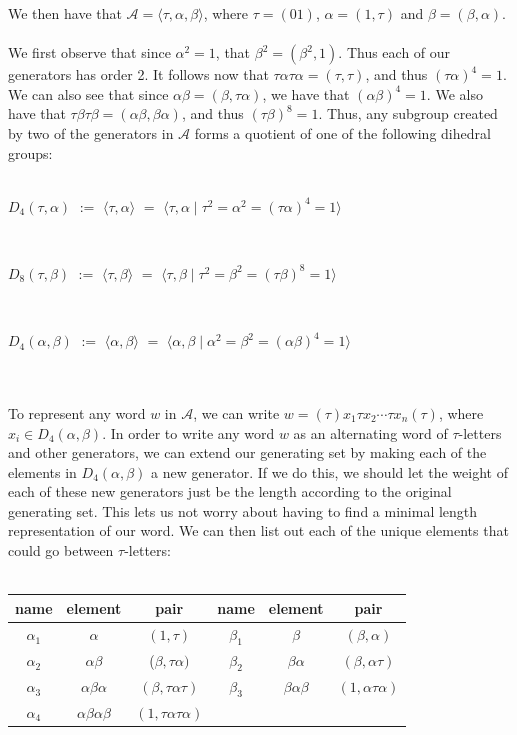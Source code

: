 \documentclass[11pt]{amsart}
\theoremstyle{definition}
\theoremstyle{remark}
\numberwithin{equation}{section}
\begin{document}
\noindent We then have that $\mathcal{A} = \langle \tau, \alpha, \beta \rangle$, where $\tau= (01)$, $\alpha = (1,\tau)$ and $\beta = (\beta, \alpha)$. \\ \\
We first observe that since $\alpha^{2} = 1$, that $\beta^{2} = (\beta^{2}, 1)$. Thus each of our generators has order 2. It follows now that $ \tau \alpha \tau \alpha = (\tau, \tau)$, and thus $(\tau \alpha)^{4} = 1$. We can also see that since $\alpha \beta = ( \beta, \tau \alpha)$, we have that $(\alpha \beta)^{4} = 1$. We also have that $\tau \beta \tau \beta = (\alpha \beta, \beta \alpha)$, and thus $(\tau \beta)^{8} = 1$. Thus, any subgroup created by two of the generators in $\mathcal{A}$ forms a quotient of one of the following dihedral groups: \\ \\
\centerline{$D_{4}(\tau, \alpha)$ $:=$ $\langle \tau, \alpha \rangle$ $=$ $\langle \tau, \alpha \mid \tau^{2} = \alpha^{2} = (\tau\alpha)^{4} = 1 \rangle$} \\
\centerline{$D_{8}(\tau, \beta)$ $:=$ $\langle \tau, \beta \rangle$ $=$ $\langle \tau, \beta \mid \tau^{2} = \beta^{2} = (\tau\beta)^{8} = 1 \rangle$} \\ 
\centerline{$D_{4}(\alpha, \beta)$ $:=$ $\langle \alpha, \beta \rangle$ $=$ $\langle \alpha, \beta \mid \alpha^{2} = \beta^{2} = (\alpha \beta)^{4} = 1 \rangle$} \\ \\
\noindent To represent any word $w$ in $\mathcal{A}$, we can write $w = (\tau) x_{1} \tau x_{2} \cdots \tau x_{n} (\tau) $, where $x_{i} \in D_{4}(\alpha, \beta)$. In order to write any word $w$ as an alternating word of $\tau$-letters and other generators, we can extend our generating set by making each of the elements in $D_{4}(\alpha, \beta)$ a new generator. If we do this, we should let the weight of each of these new generators just be the length according to the original generating set. This lets us not worry about having to find a minimal length representation of our word. We can then list out each of the unique elements that could go between $\tau$-letters: \\ \\
\begin{center}
\begin{tabular}{ c | c | c | c | c | c }
  name & element & pair & name & element & pair \\ \hline
  $\alpha_{1}$ & $\alpha$ & $(1, \tau)$ & $\beta_{1}$ & $\beta$ & $(\beta, \alpha)$\\ 
  $\alpha_{2}$ & $\alpha \beta$ & ($\beta, \tau \alpha)$ & $\beta_{2}$ & $\beta \alpha$ & $(\beta, \alpha \tau )$  \\ 
  $\alpha_{3}$ & $\alpha \beta \alpha$ & $(\beta, \tau \alpha \tau)$ & $\beta_{3}$ & $\beta \alpha \beta$ & $(1, \alpha \tau \alpha)$ \\ 
  $\alpha_{4}$ & $\alpha \beta \alpha \beta$ & $(1, \tau \alpha \tau \alpha)$ & \\ 
\end{tabular}
\end{center}
\end{document}
